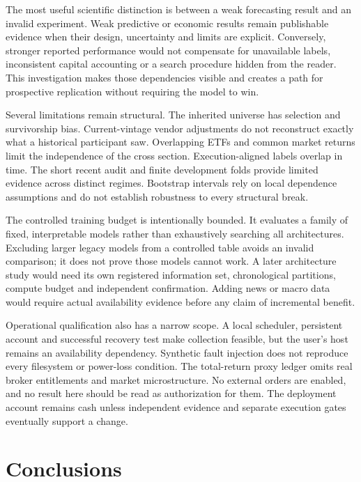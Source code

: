 \documentclass[11pt,a4paper]{article}
\begin{document}
The most useful scientific distinction is between a weak forecasting result and an invalid experiment. Weak predictive or economic results remain publishable evidence when their design, uncertainty and limits are explicit. Conversely, stronger reported performance would not compensate for unavailable labels, inconsistent capital accounting or a search procedure hidden from the reader. This investigation makes those dependencies visible and creates a path for prospective replication without requiring the model to win.

Several limitations remain structural. The inherited universe has selection and survivorship bias. Current-vintage vendor adjustments do not reconstruct exactly what a historical participant saw. Overlapping ETFs and common market returns limit the independence of the cross section. Execution-aligned labels overlap in time. The short recent audit and finite development folds provide limited evidence across distinct regimes. Bootstrap intervals rely on local dependence assumptions and do not establish robustness to every structural break.

The controlled training budget is intentionally bounded. It evaluates a family of fixed, interpretable models rather than exhaustively searching all architectures. Excluding larger legacy models from a controlled table avoids an invalid comparison; it does not prove those models cannot work. A later architecture study would need its own registered information set, chronological partitions, compute budget and independent confirmation. Adding news or macro data would require actual availability evidence before any claim of incremental benefit.

Operational qualification also has a narrow scope. A local scheduler, persistent account and successful recovery test make collection feasible, but the user's host remains an availability dependency. Synthetic fault injection does not reproduce every filesystem or power-loss condition. The total-return proxy ledger omits real broker entitlements and market microstructure. No external orders are enabled, and no result here should be read as authorization for them. The deployment account remains cash unless independent evidence and separate execution gates eventually support a change.


\section{Conclusions}\label{sec:section-12}
\end{document}

